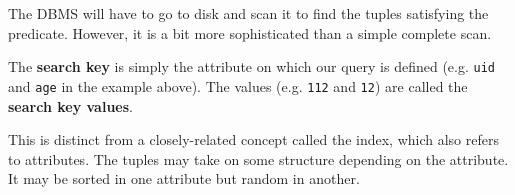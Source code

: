 \documentclass{article}
\begin{document}
    The DBMS will have to go to disk and scan it to find the tuples satisfying the predicate. However, it is a bit more sophisticated than a simple complete scan. 

    \begin{definition}
      The \textbf{search key} is simply the attribute on which our query is defined (e.g. \texttt{uid} and \texttt{age} in the example above). The values (e.g. \texttt{112} and \texttt{12}) are called the \textbf{search key values}. 
    \end{definition} 

    This is distinct from a closely-related concept called the index, which also refers to attributes. The tuples may take on some structure depending on the attribute. It may be sorted in one attribute but random in another. 
\end{document}
